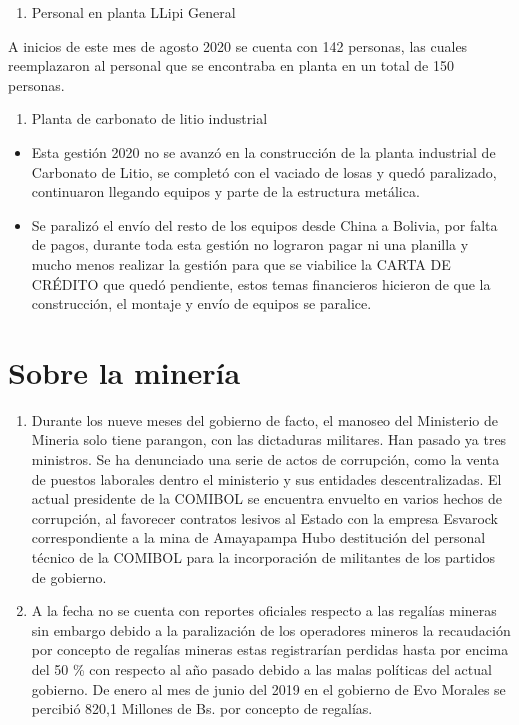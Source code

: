 \documentclass[a4paper, nobind]{templates/ociamthesis}
\providecommand{\tightlist}{%
  \setlength{\itemsep}{0pt}\setlength{\parskip}{0pt}}
\begin{document}
\begin{enumerate}
\def\labelenumi{\arabic{enumi}.}
\setcounter{enumi}{8}
\tightlist
\item
  Personal en planta LLipi General
\end{enumerate}

A inicios de este mes de agosto 2020 se cuenta con 142 personas, las cuales reemplazaron al personal que se encontraba en planta en un total de 150 personas.

\begin{enumerate}
\def\labelenumi{\arabic{enumi}.}
\setcounter{enumi}{9}
\tightlist
\item
  Planta de carbonato de litio industrial
\end{enumerate}

\begin{itemize}
\item
  Esta gestión 2020 no se avanzó en la construcción de la planta industrial de Carbonato de Litio, se completó con el vaciado de losas y quedó paralizado, continuaron llegando equipos y parte de la estructura metálica.
\item
  Se paralizó el envío del resto de los equipos desde China a Bolivia, por falta de pagos, durante toda esta gestión no lograron pagar ni una planilla y mucho menos realizar la gestión para que se viabilice la CARTA DE CRÉDITO que quedó pendiente, estos temas financieros hicieron de que la construcción, el montaje y envío de equipos se paralice.
\end{itemize}

\hypertarget{sobre-la-mineruxeda}{%
\chapter{Sobre la minería}\label{sobre-la-mineruxeda}}

\begin{enumerate}
\def\labelenumi{\arabic{enumi}.}
\item
  Durante los nueve meses del gobierno de facto, el manoseo del Ministerio de Mineria solo tiene parangon, con las dictaduras militares. Han pasado ya tres ministros. Se ha denunciado una serie de actos de corrupción, como la venta de puestos laborales dentro el ministerio y sus entidades descentralizadas. El actual presidente de la COMIBOL se encuentra envuelto en varios hechos de corrupción, al favorecer contratos lesivos al Estado con la empresa Esvarock correspondiente a la mina de Amayapampa Hubo destitución del personal técnico de la COMIBOL para la incorporación de militantes de los partidos de gobierno.
\item
  A la fecha no se cuenta con reportes oficiales respecto a las regalías mineras sin embargo debido a la paralización de los operadores mineros la recaudación por concepto de regalías mineras estas registrarían perdidas hasta por encima del 50 \% con respecto al año pasado debido a las malas políticas del actual gobierno. De enero al mes de junio del 2019 en el gobierno de Evo Morales se percibió 820,1 Millones de Bs. por concepto de regalías.
\end{enumerate}
\end{document}
